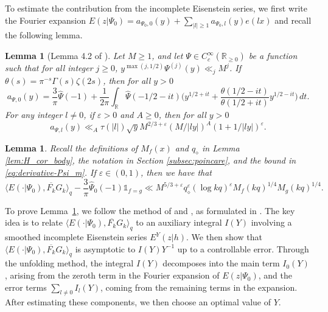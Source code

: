 \documentclass[12pt,reqno]{amsart}
\newtheorem{lem}[thm]{Lemma}
\theoremstyle{remark}
\numberwithin{equation}{section}
\begin{document}
 	 
    To estimate the contribution from the incomplete Eisenstein series, we first write the Fourier expansion
    $
        E(z|\Psi_0) = a_{\Psi_0,0}(y) + \sum_{|l|\ge 1} a_{\Psi_0, l}(y)e(lx)$ and recall the following lemma.
	\begin{lem}[Lemma 4.2 of \cite{BH}]\label{lem:Fourier-IES} 
        Let $M \ge 1$, and let $\Psi \in C^{\infty}_c(\mathbb{R}_{\ge 0})$ be a function such that for all integer $j \ge 0$, $y^{\max(j, 1/2)}\Psi^{(j)}(y) \ll_j M^{j}$. If $\theta(s)=\pi^{-s}\Gamma(s)\zeta(2s)$, then for all $y > 0$
		\begin{equation}\label{eq:fourier,0}
			a_{\Psi,0}(y) = \frac{3}{\pi}\widehat{\Psi}(-1) + \frac{1}{2\pi}\int_\mathbb{R} \widehat{\Psi}(-1/2-it)\Big(y^{1/2+it} + \frac{\theta(1/2-it)}{\theta(1/2+it)}y^{1/2-it}\Big)\, dt.
		\end{equation}
            For any integer $l \neq 0$, if $\varepsilon > 0$ and $A \ge 0$, then for all $y > 0$
        \begin{equation}\label{eq:fourier,neq0}
                a_{\Psi,l}(y) \ll_{A}  \tau(|l|)\sqrt{y} M^{2/3+\varepsilon}(M/|ly|)^A(1+{1}/{|ly|})^\varepsilon.
		\end{equation}
	\end{lem}
 \begin{lem}\label{lem:H_cor_main} 
		Recall the definitions of $M_f(x)$ and $q_{\diamond}$ in Lemma \ref{lem:H_cor_body}, the notation in Section \ref{subsec:poincare}, and the bound in \eqref{eq:derivative-Psi_m}.  
        If $\varepsilon \in (0,1)$, then we have that
		\[
		\langle E(\cdot|\Psi_0), \overline{F_k}G_k \rangle_q  - \frac{3}{\pi}\widehat{\Psi}_0(-1)\mathds{1}_{f=g}  \ll M^{5/3+\varepsilon}q_\diamond^\varepsilon (\log kq)^\varepsilon M_f(kq)^{1/4}M_g(kq)^{1/4}.
		\]
	\end{lem}
        To prove Lemma~\ref{lem:H_cor_main}, we follow the method of \cite{H} and \cite{LMR}, as formulated in \cite[Lemma~4.4]{BH}. The key idea is to relate $\langle E(\cdot|\Psi_{0}), \overline{F_{k}} G_{k} \rangle_{q}$
        to an auxiliary integral $I(Y)$ involving a smoothed incomplete Eisenstein series $E^{Y}(z| h)$. 
        We then show that $\langle E(\cdot|\Psi_{0}), \overline{F_{k}} G_{k} \rangle_{q}$ is asymptotic to $I(Y)Y^{-1}$ up to a controllable error. 
        Through the unfolding method, the integral $I(Y)$ decomposes into the main term $I_{0}(Y)$, arising from the zeroth term in the Fourier expansion of $E(z | \Psi_{0})$, and the error terms $\sum_{l \ne 0} I_{l}(Y)$, coming from the remaining terms in the expansion. After estimating these components, we then choose an optimal value of $Y$.
\end{document}
